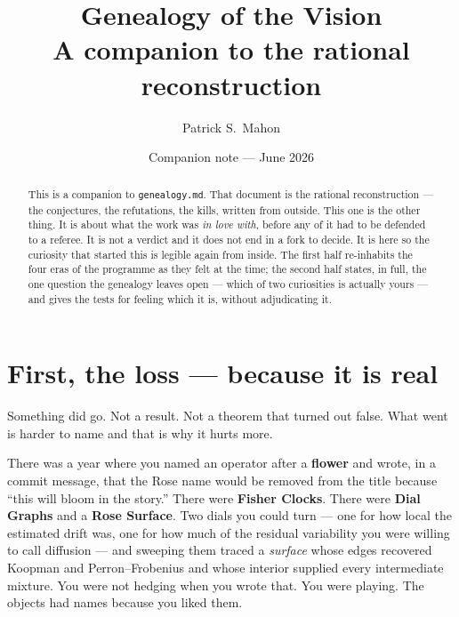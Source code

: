 \documentclass[11pt]{article}
\title{Genealogy of the Vision\\
\large A companion to the rational reconstruction}
\author{Patrick S.\ Mahon}
\date{Companion note --- June 2026}
\theoremstyle{remark}
\begin{document}
\maketitle

\begin{abstract}
\noindent
This is a companion to \texttt{genealogy.md}. That document is the rational
reconstruction --- the conjectures, the refutations, the kills, written from
outside. This one is the other thing. It is about what the work was \emph{in love
with}, before any of it had to be defended to a referee. It is not a verdict and
it does not end in a fork to decide. It is here so the curiosity that started
this is legible again from inside. The first half re-inhabits the four eras of
the programme as they felt at the time; the second half states, in full, the one
question the genealogy leaves open --- which of two curiosities is actually
yours --- and gives the tests for feeling which it is, without adjudicating it.
\end{abstract}

\medskip\noindent{}

\tableofcontents

\section{First, the loss --- because it is real}

Something did go. Not a result. Not a theorem that turned out false. What went is
harder to name and that is why it hurts more.

There was a year where you named an operator after a \textbf{flower} and wrote,
in a commit message, that the Rose name would be removed from the title because
``this will bloom in the story.'' There were \textbf{Fisher Clocks}. There were
\textbf{Dial Graphs} and a \textbf{Rose Surface}. Two dials you could turn --- one
for how local the estimated drift was, one for how much of the residual
variability you were willing to call diffusion --- and sweeping them traced a
\emph{surface} whose edges recovered Koopman and Perron--Frobenius and whose
interior supplied every intermediate mixture. You were not hedging when you wrote
that. You were playing. The objects had names because you liked them.
\end{document}
